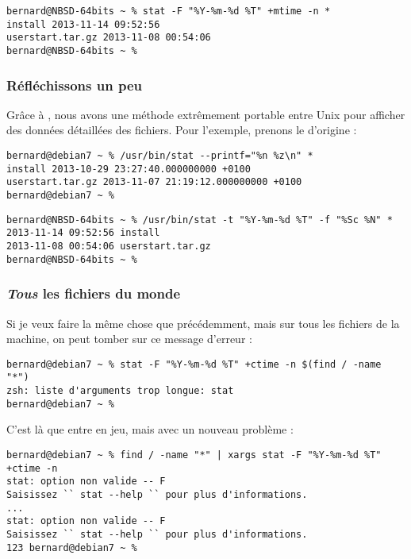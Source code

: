\begin{lstlisting}[caption=stat depuis zsh sous NetBSD]
bernard@NBSD-64bits ~ % stat -F "%Y-%m-%d %T" +mtime -n *
install 2013-11-14 09:52:56
userstart.tar.gz 2013-11-08 00:54:06
bernard@NBSD-64bits ~ %
\end{lstlisting}

\subsubsection{Réfléchissons un peu}
Grâce à \zsh{}, nous avons une méthode extrêmement portable entre Unix pour afficher des données détaillées des fichiers. Pour l'exemple, prenons le  d'origine :

\begin{lstlisting}[caption=binaire stat depuis Debian]
bernard@debian7 ~ % /usr/bin/stat --printf="%n %z\n" *
install 2013-10-29 23:27:40.000000000 +0100
userstart.tar.gz 2013-11-07 21:19:12.000000000 +0100
bernard@debian7 ~ %
\end{lstlisting}

\begin{lstlisting}[caption=binaire stat depuis NetBSD]
bernard@NBSD-64bits ~ % /usr/bin/stat -t "%Y-%m-%d %T" -f "%Sc %N" *
2013-11-14 09:52:56 install
2013-11-08 00:54:06 userstart.tar.gz
bernard@NBSD-64bits ~ %
\end{lstlisting}

\subsubsection{\emph{Tous} les fichiers du monde}
Si je veux faire la même chose que précédemment, mais sur tous les fichiers de la machine, on peut tomber sur ce message d'erreur :

\begin{lstlisting}
bernard@debian7 ~ % stat -F "%Y-%m-%d %T" +ctime -n $(find / -name "*")
zsh: liste d'arguments trop longue: stat
bernard@debian7 ~ %
\end{lstlisting}

C'est là que  entre en jeu, mais avec un nouveau problème :

\begin{lstlisting}[caption=stat rien ne va plus]
bernard@debian7 ~ % find / -name "*" | xargs stat -F "%Y-%m-%d %T" +ctime -n
stat: option non valide -- F
Saisissez `` stat --help `` pour plus d'informations.
...
stat: option non valide -- F
Saisissez `` stat --help `` pour plus d'informations.
123 bernard@debian7 ~ %
\end{lstlisting}

